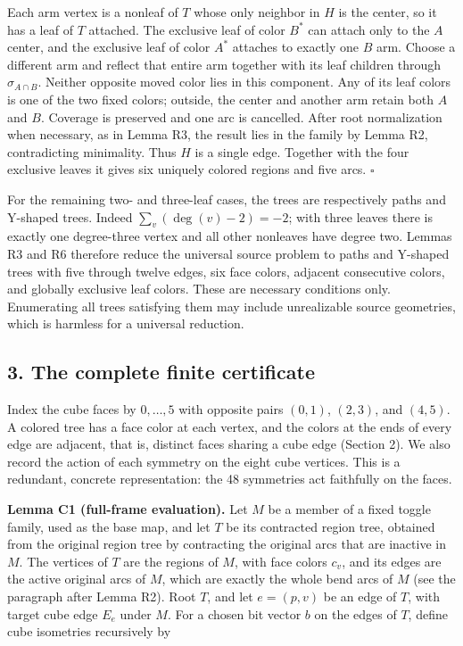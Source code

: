 \documentclass[
  11pt,
]{article}
\begin{document}
Each arm vertex is a nonleaf of \(T\) whose only neighbor in \(H\) is
the center, so it has a leaf of \(T\) attached. The exclusive leaf of
color \(B^*\) can attach only to the \(A\) center, and the exclusive
leaf of color \(A^*\) attaches to exactly one \(B\) arm. Choose a
different arm and reflect that entire arm together with its leaf
children through \(\sigma_{A\cap B}\). Neither opposite moved color lies
in this component. Any of its leaf colors is one of the two fixed
colors; outside, the center and another arm retain both \(A\) and \(B\).
Coverage is preserved and one arc is cancelled. After root normalization
when necessary, as in Lemma R3, the result lies in the family by Lemma
R2, contradicting minimality. Thus \(H\) is a single edge. Together with
the four exclusive leaves it gives six uniquely colored regions and five
arcs. \(\square\)

For the remaining two- and three-leaf cases, the trees are respectively
paths and Y-shaped trees. Indeed \(\sum_v(\deg(v)-2)=-2\); with three
leaves there is exactly one degree-three vertex and all other nonleaves
have degree two. Lemmas R3 and R6 therefore reduce the universal source
problem to paths and Y-shaped trees with five through twelve edges, six
face colors, adjacent consecutive colors, and globally exclusive leaf
colors. These are necessary conditions only. Enumerating all trees
satisfying them may include unrealizable source geometries, which is
harmless for a universal reduction.

\subsection{3. The complete finite
certificate}\label{the-complete-finite-certificate}

Index the cube faces by \(0,\ldots,5\) with opposite pairs \((0,1)\),
\((2,3)\), and \((4,5)\). A colored tree has a face color at each
vertex, and the colors at the ends of every edge are adjacent, that is,
distinct faces sharing a cube edge (Section 2). We also record the
action of each symmetry on the eight cube vertices. This is a redundant,
concrete representation: the 48 symmetries act faithfully on the faces.

\textbf{Lemma C1 (full-frame evaluation).} Let \(M\) be a member of a
fixed toggle family, used as the base map, and let \(T\) be its
contracted region tree, obtained from the original region tree by
contracting the original arcs that are inactive in \(M\). The vertices
of \(T\) are the regions of \(M\), with face colors \(c_v\), and its
edges are the active original arcs of \(M\), which are exactly the whole
bend arcs of \(M\) (see the paragraph after Lemma R2). Root \(T\), and
let \(e=(p,v)\) be an edge of \(T\), with target cube edge \(E_e\) under
\(M\). For a chosen bit vector \(b\) on the edges of \(T\), define cube
isometries recursively by
\end{document}
